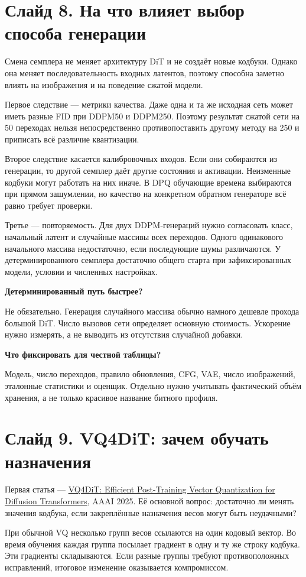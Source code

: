 \documentclass[a4paper,11pt]{article}
\newcommand{\slide}[2]{\clearpage\section*{Слайд #1. #2}}
\newcommand{\question}[1]{\par\textbf{#1}\par}
\begin{document}
\slide{8}{На что влияет выбор способа генерации}
Смена семплера не меняет архитектуру DiT и не создаёт новые кодбуки.
Однако она меняет последовательность входных латентов, поэтому
способна заметно влиять на изображения и на поведение сжатой модели.

Первое следствие --- метрики качества. Даже одна и та же исходная
сеть может иметь разные FID при DDPM50 и DDPM250. Поэтому результат
сжатой сети на 50 переходах нельзя непосредственно противопоставить
другому методу на 250 и приписать всё различие квантизации.

Второе следствие касается калибровочных входов. Если они собираются
из генерации, то другой семплер даёт другие состояния и активации.
Неизменные кодбуки могут работать на них иначе. В DPQ обучающие
времена выбираются при прямом зашумлении, но качество на конкретном
обратном генераторе всё равно требует проверки.

Третье --- повторяемость. Для двух DDPM-генераций нужно согласовать
класс, начальный латент и случайные массивы всех переходов.
Одного одинакового начального массива недостаточно, если последующие
шумы различаются. У детерминированного семплера достаточно общего
старта при зафиксированных модели, условии и численных настройках.

\question{Детерминированный путь быстрее?}
Не обязательно. Генерация случайного массива обычно намного дешевле
прохода большой DiT. Число вызовов сети определяет основную стоимость.
Ускорение нужно измерять, а не выводить из отсутствия случайной добавки.

\question{Что фиксировать для честной таблицы?}
Модель, число переходов, правило обновления, CFG, VAE, число изображений,
эталонные статистики и оценщик. Отдельно нужно учитывать фактический
объём хранения, а не только красивое название битного профиля.

\slide{9}{VQ4DiT: зачем обучать назначения}
Первая статья --- \href{https://ojs.aaai.org/index.php/AAAI/article/view/33782/35937}
{VQ4DiT: Efficient Post-Training Vector Quantization for Diffusion Transformers},
AAAI 2025. Её основной вопрос: достаточно ли менять значения кодбука,
если закреплённые назначения весов могут быть неудачными?

При обычной VQ несколько групп весов ссылаются на один кодовый вектор.
Во время обучения каждая группа посылает градиент в одну и ту же строку
кодбука. Эти градиенты складываются. Если разные группы требуют
противоположных исправлений, итоговое изменение оказывается компромиссом.
\end{document}
